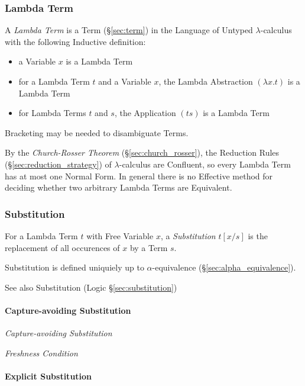 \subsubsection{Lambda Term}\label{sec:lambda_term}

A \emph{Lambda Term} is a Term (\S\ref{sec:term}) in the Language of
Untyped $\lambda$-calculus with the following Inductive definition:
\begin{itemize}
  \item a Variable $x$ is a Lambda Term
  \item for a Lambda Term $t$ and a Variable $x$, the Lambda
    Abstraction $(\lambda x.t)$ is a Lambda Term
  \item for Lambda Terms $t$ and $s$, the Application $(ts)$ is a
    Lambda Term
\end{itemize}
Bracketing may be needed to disambiguate Terms.

By the \emph{Church-Rosser Theorem} (\S\ref{sec:church_rosser}), the
Reduction Rules (\S\ref{sec:reduction_strategy}) of $\lambda$-calculus
are Confluent, so every Lambda Term has at most one Normal Form. In
general there is no Effective method for deciding whether two
arbitrary Lambda Terms are Equivalent.




\subsubsection{Substitution}\label{sec:lambda_substitution}

For a Lambda Term $t$ with Free Variable $x$, a \emph{Substitution}
$t[x/s]$ is the replacement of all occurences of $x$ by a Term $s$.

Substitution is defined uniquiely up to $\alpha$-equivalence
(\S\ref{sec:alpha_equivalence}).

\fist See also Substitution (Logic \S\ref{sec:substitution})



\paragraph{Capture-avoiding Substitution}\label{sec:capture_avoiding}\hfill

\emph{Capture-avoiding Substitution}

\emph{Freshness Condition}



\paragraph{Explicit Substitution}\label{sec:explicit_substitution}\hfill



